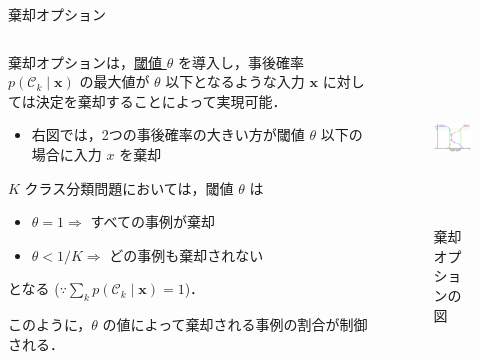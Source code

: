 \documentclass[uplatex,11pt,dvipdfmx,aspectratio=169,unicode,t]{beamer}
\numberwithin{equation}{section}
\newcommand{\CC}{\mathcal{C}}
\newcommand{\bs}[1]{\boldsymbol{#1}}
\newcommand{\1}{\bs{1}}
\newcommand{\0}{\bs{0}}
\begin{document}
\begin{frame}{棄却オプション}
    \begin{columns}
        \begin{column}{0.5\textwidth}
            棄却オプションは，\underline{閾値 $\theta$} を導入し，事後確率 $p(\CC_{k} \mid \bs{x})$ の最大値が $\theta$ 以下となるような入力 $\bs{x}$ に対しては決定を棄却することによって実現可能．
            \begin{itemize}
                \item 右図では，2つの事後確率の大きい方が閾値 $\theta$ 以下の場合に入力 $x$ を棄却
            \end{itemize}
            $K$ クラス分類問題においては，閾値 $\theta$ は
            \begin{itemize}
                \item $\theta = 1 \Longrightarrow$ すべての事例が棄却
                \item $\theta < 1/K \Longrightarrow$ どの事例も棄却されない
            \end{itemize}
            となる ($\because \sum_{k} p(\CC_{k} \mid \bs{x}) = 1$)．

            このように，$\theta$ の値によって棄却される事例の割合が制御される．
        \end{column}
        \begin{column}{0.5\textwidth}
            \begin{figure}
                \centering
                \includegraphics[height=4.5cm]{prml_fig_1-26.png}
                \caption{棄却オプションの図}
                \label{fig:1.26}
            \end{figure}
        \end{column}
    \end{columns}
\end{frame}
\end{document}
